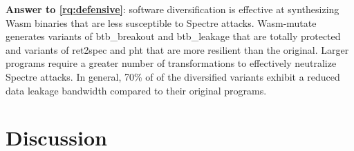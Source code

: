 \documentclass[sigplan,screen]{acmart}
\newcommand*\badge[1]{ \colorbox{red}{\color{white}#1}}
\newcommand{\tool}{Wasm-mutate\xspace}
\newcommand{\wasm}{Wasm\xspace}
\newcommand{\todo}[1]{%
\refstepcounter{todo}
\noindent\textbf{\badge{TODO}} {\color{red}#1}
\addcontentsline{td}{todo}
{\color{red}\thesection.\thetodo\xspace #1}}
\begin{document}

\begin{tcolorbox}[boxrule=1pt,arc=.3em,boxsep=-1.3mm]
  \textbf{Answer to \ref{rq:defensive}}:   software diversification is effective at synthesizing \wasm binaries that are less susceptible  to Spectre attacks.  
  \tool generates variants of btb\_breakout and btb\_leakage that are totally protected and variants of ret2spec and pht that are more resilient than the original.
Larger programs require a greater number of transformations to effectively neutralize Spectre attacks.
    In general, 70\% of of the diversified variants exhibit a reduced data leakage bandwidth compared to their original programs.
\end{tcolorbox}

















\section{Discussion}
\label{discussion}
\end{document}
